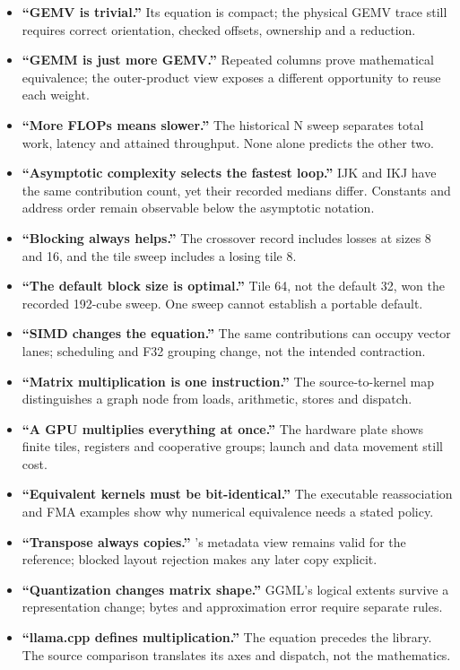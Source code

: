 \begin{itemize}
\tightlist
\item
  \textbf{``GEMV is trivial.''} Its equation is compact; the physical
  GEMV trace still requires correct orientation, checked offsets,
  ownership and a reduction.
\item
  \textbf{``GEMM is just more GEMV.''} Repeated columns prove
  mathematical equivalence; the outer-product view exposes a different
  opportunity to reuse each weight.
\item
  \textbf{``More FLOPs means slower.''} The historical N sweep separates
  total work, latency and attained throughput. None alone predicts the
  other two.
\item
  \textbf{``Asymptotic complexity selects the fastest loop.''} IJK and
  IKJ have the same contribution count, yet their recorded medians
  differ. Constants and address order remain observable below the
  asymptotic notation.
\item
  \textbf{``Blocking always helps.''} The crossover record includes
  losses at sizes 8 and 16, and the tile sweep includes a losing tile 8.
\item
  \textbf{``The default block size is optimal.''} Tile 64, not the
  default 32, won the recorded 192-cube sweep. One sweep cannot
  establish a portable default.
\item
  \textbf{``SIMD changes the equation.''} The same contributions can
  occupy vector lanes; scheduling and F32 grouping change, not the
  intended contraction.
\item
  \textbf{``Matrix multiplication is one instruction.''} The
  source-to-kernel map distinguishes a graph node from loads,
  arithmetic, stores and dispatch.
\item
  \textbf{``A GPU multiplies everything at once.''} The hardware plate
  shows finite tiles, registers and cooperative groups; launch and data
  movement still cost.
\item
  \textbf{``Equivalent kernels must be bit-identical.''} The executable
  reassociation and FMA examples show why numerical equivalence needs a
  stated policy.
\item
  \textbf{``Transpose always copies.''} 's metadata view
  remains valid for the reference; blocked layout rejection makes any
  later copy explicit.
\item
  \textbf{``Quantization changes matrix shape.''} GGML's logical extents
  survive a representation change; bytes and approximation error require
  separate rules.
\item
  \textbf{``llama.cpp defines multiplication.''} The equation precedes
  the library. The source comparison translates its axes and dispatch,
  not the mathematics.
\end{itemize}

